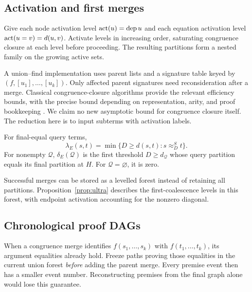 \subsection{Activation and first merges}
Give each node activation level $\operatorname{act}(u)=\operatorname{dep} u$ and each equation activation level $\operatorname{act}(u=v)=d(u,v)$. Activate levels in increasing order, saturating congruence closure at each level before proceeding. The resulting partitions form a nested family on the growing active sets.

A union--find implementation uses parent lists and a signature table keyed by $(f,[u_1],\ldots,[u_k])$. Only affected parent signatures need reconsideration after a merge. Classical congruence-closure algorithms provide the relevant efficiency bounds, with the precise bound depending on representation, arity, and proof bookkeeping \cite{DowneySethiTarjan1980,NieuwenhuisOliveras2007}. We claim no new asymptotic bound for congruence closure itself. The reduction here is to input subterms with activation labels.

\begin{corollary}\label{cor:firstmerge}
For final-equal query terms,
\[
\lambda_E(s,t)=\min\{D\ge d(s,t):s\approx_D^S t\}.
\]
For nonempty $\mathcal Q$, $\delta_E(\mathcal Q)$ is the first threshold $D\ge d_{\mathcal Q}$ whose query partition equals its final partition at $H$. For $\mathcal Q=\varnothing$, it is zero.
\end{corollary}

Successful merges can be stored as a levelled forest instead of retaining all partitions. Proposition~\ref{prop:ultra} describes the first-coalescence levels in this forest, with endpoint activation accounting for the nonzero diagonal.

\subsection{Chronological proof DAGs}
When a congruence merge identifies $f(s_1,\ldots,s_k)$ with $f(t_1,\ldots,t_k)$, its argument equalities already hold. Freeze paths proving those equalities in the current union forest \emph{before} adding the parent merge. Every premise event then has a smaller event number. Reconstructing premises from the final graph alone would lose this guarantee.

